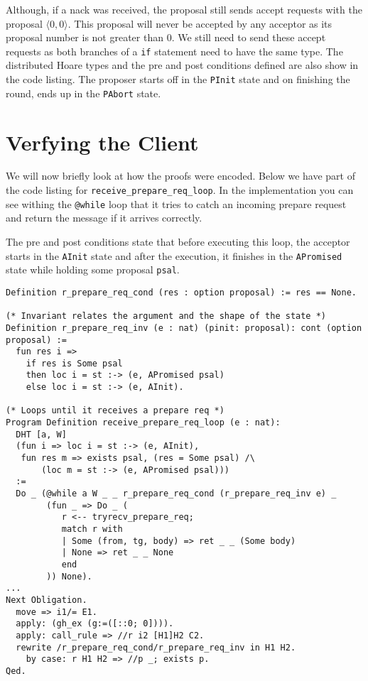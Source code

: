 Although, if a nack was received, the proposal still sends
accept requests with the proposal $\langle 0, 0 \rangle$. This proposal will
never be accepted by any acceptor as its proposal number is not greater than $0$.
We still need to send these accept requests as both branches of a \texttt{if}
statement need to have the same type. The distributed Hoare types and the pre and post conditions
defined are also show in the code listing. The proposer starts off in the \texttt{PInit}
state and on finishing the round, ends up in the \texttt{PAbort} state.

\section{Verfying the Client}
We will now briefly look at how the proofs were encoded.
Below we have part of the code listing for \texttt{receive\_prepare\_req\_loop}.
In the implementation you can see withing the \texttt{@while} loop that it
tries to catch an incoming prepare request and return the message if it
arrives correctly.

The pre and post conditions state that before executing this loop, the acceptor
starts in the \texttt{AInit} state and after the execution, it finishes in
the \texttt{APromised} state while holding some proposal \texttt{psal}.

\begin{lstlisting}
Definition r_prepare_req_cond (res : option proposal) := res == None.

(* Invariant relates the argument and the shape of the state *)
Definition r_prepare_req_inv (e : nat) (pinit: proposal): cont (option proposal) :=
  fun res i =>
    if res is Some psal
    then loc i = st :-> (e, APromised psal)
    else loc i = st :-> (e, AInit).

(* Loops until it receives a prepare req *)
Program Definition receive_prepare_req_loop (e : nat):
  DHT [a, W]
  (fun i => loc i = st :-> (e, AInit),
   fun res m => exists psal, (res = Some psal) /\
       (loc m = st :-> (e, APromised psal)))
  :=
  Do _ (@while a W _ _ r_prepare_req_cond (r_prepare_req_inv e) _
        (fun _ => Do _ (
           r <-- tryrecv_prepare_req;
           match r with
           | Some (from, tg, body) => ret _ _ (Some body)
           | None => ret _ _ None
           end
        )) None).
...
Next Obligation.
  move => i1/= E1.
  apply: (gh_ex (g:=([::0; 0]))).
  apply: call_rule => //r i2 [H1]H2 C2.
  rewrite /r_prepare_req_cond/r_prepare_req_inv in H1 H2.
    by case: r H1 H2 => //p _; exists p.
Qed.
\end{lstlisting}

